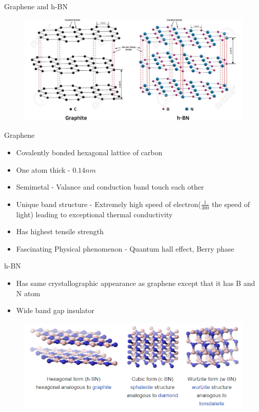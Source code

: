 \documentclass{beamer}
\begin{document}
\begin{frame}{Graphene and h-BN}
    \begin{figure}
        \centering
        \includegraphics{133940929-hexagonal-boron-nitride-and-carbon-graphite-crystalline-structure.jpg}
    \end{figure}
\end{frame}

\begin{frame}{Graphene}
\begin{itemize}
\setlength\itemsep{1em}
    \item Covalently bonded hexagonal lattice of carbon
    \item One atom thick - $0.14 nm$
    \item Semimetal - Valance and conduction band touch each other
    \item Unique band structure - Extremely high speed of electron($\frac{1}{300}$ the speed of light) leading to exceptional thermal conductivity
    \item Has highest tensile strength
    \item Fascinating Physical phenomenon - Quantum hall effect, Berry phase
\end{itemize}
\end{frame}

\begin{frame}{h-BN}
    \begin{itemize}
        \item Has same crystallographic appearance as graphene except that it has B and N atom
        \item Wide band gap insulator
    \end{itemize}
    \begin{figure}
        \centering
        \includegraphics[scale=0.7]{h-BN.PNG}
    \end{figure}
\end{frame}
\end{document}
